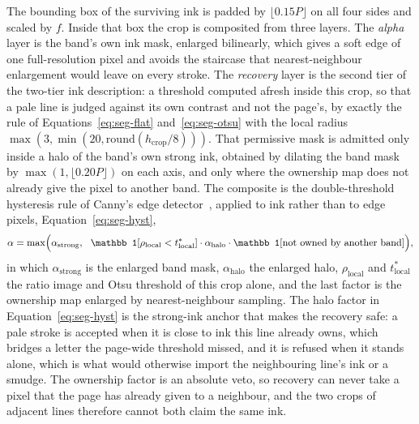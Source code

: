 The bounding box of the surviving ink is padded by $\lfloor0.15P\rfloor$ on all four sides and scaled by $f$.
Inside that box the crop is composited from three layers.
The \emph{alpha} layer is the band's own ink mask, enlarged bilinearly, which gives a soft edge of one full-resolution pixel and avoids the staircase that nearest-neighbour enlargement would leave on every stroke.
The \emph{recovery} layer is the second tier of the two-tier ink description: a threshold computed afresh inside this crop, so that a pale line is judged against its own contrast and not the page's, by exactly the rule of Equations~\ref{eq:seg-flat} and~\ref{eq:seg-otsu} with the local radius $\max(3,\min(20,\mathrm{round}(h_{\mathrm{crop}}/8)))$.
That permissive mask is admitted only inside a halo of the band's own strong ink, obtained by dilating the band mask by $\max(1,\lfloor0.20P\rfloor)$ on each axis, and only where the ownership map does not already give the pixel to another band.
The composite is the double-threshold hysteresis rule of Canny's edge detector~\cite{canny1986}, applied to ink rather than to edge pixels, Equation~\ref{eq:seg-hyst},
\begin{equation}
\alpha=\max\Bigl(\alpha_{\mathrm{strong}},\ \ \mathbb 1[\rho_{\mathrm{local}}<t^*_{\mathrm{local}}]\cdot\alpha_{\mathrm{halo}}\cdot\mathbb 1[\text{not owned by another band}]\Bigr),
\label{eq:seg-hyst}
\end{equation}
in which $\alpha_{\mathrm{strong}}$ is the enlarged band mask, $\alpha_{\mathrm{halo}}$ the enlarged halo, $\rho_{\mathrm{local}}$ and $t^*_{\mathrm{local}}$ the ratio image and Otsu threshold of this crop alone, and the last factor is the ownership map enlarged by nearest-neighbour sampling.
The halo factor in Equation~\ref{eq:seg-hyst} is the strong-ink anchor that makes the recovery safe: a pale stroke is accepted when it is close to ink this line already owns, which bridges a letter the page-wide threshold missed, and it is refused when it stands alone, which is what would otherwise import the neighbouring line's ink or a smudge.
The ownership factor is an absolute veto, so recovery can never take a pixel that the page has already given to a neighbour, and the two crops of adjacent lines therefore cannot both claim the same ink.

